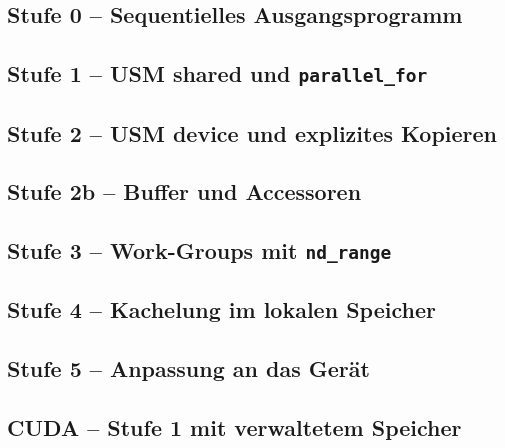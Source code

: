 \documentclass[12pt,a4paper]{article}
\begin{document}
\subsection{Stufe 0 -- Sequentielles Ausgangsprogramm}\label{lst:stufe0}


\subsection{Stufe 1 -- USM shared und \texttt{parallel\_for}}\label{lst:stufe1}


\subsection{Stufe 2 -- USM device und explizites Kopieren}\label{lst:stufe2}


\subsection{Stufe 2b -- Buffer und Accessoren}\label{lst:stufe2b}


\subsection{Stufe 3 -- Work-Groups mit \texttt{nd\_range}}\label{lst:stufe3}


\subsection{Stufe 4 -- Kachelung im lokalen Speicher}\label{lst:stufe4}


\subsection{Stufe 5 -- Anpassung an das Gerät}\label{lst:stufe5}


\subsection{CUDA -- Stufe 1 mit verwaltetem Speicher}

\end{document}
